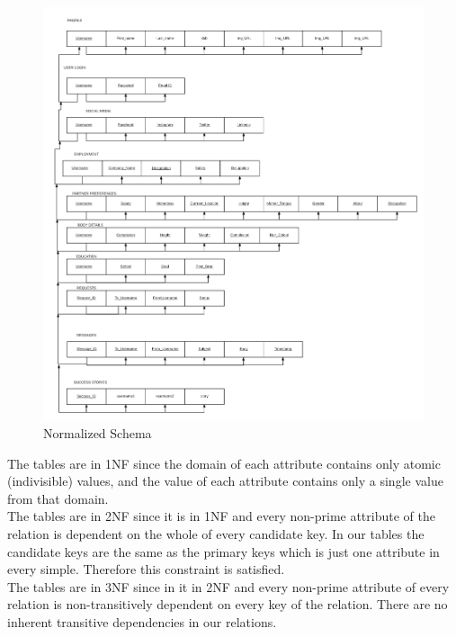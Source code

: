 \documentclass[12pt]{report}
\begin{document}
\begin{figure}[!htb]
    \centering
    \includegraphics[width=1\textwidth]{Normalized-Tables.png}
    \caption{Normalized Schema}
    \label{fig:Normalized Schema}
\end{figure}

\noindent The tables are in 1NF since the domain of each attribute contains only atomic (indivisible) values, and the value of each attribute contains only a single value from that domain. \\

\noindent The tables are in 2NF since it is in 1NF and every non-prime attribute of the relation is dependent on the whole of every candidate key. In our tables the candidate keys are the same as the primary keys which is just one attribute in every simple. Therefore this constraint is satisfied. \\
 
\noindent The tables are in 3NF since in it in 2NF and every non-prime attribute of every relation is non-transitively dependent on every key of the relation. There are no inherent transitive dependencies in our relations. \\

 
\end{document}
